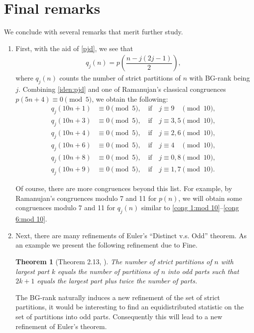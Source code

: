 \documentclass[12pt,reqno]{amsart}
\numberwithin{equation}{section}
\theoremstyle{plain}
\newtheorem{theorem}{Theorem}[section]
\theoremstyle{definition}
\begin{document}
\section{Final remarks}
We conclude with several remarks that merit further study.
\begin{enumerate}[1)]
\item First, with the aid of \eqref{pjd}, we see that
\begin{align}\label{iden:pjd}
q_{j}(n)=p\left(\dfrac{n-j(2j-1)}{2}\right),
\end{align}
where $q_{j}(n)$ counts the number of strict partitions of $n$ with BG-rank being $j$. Combining \eqref{iden:pjd} and one of Ramanujan's classical congruences \cite{Ram} $p(5n+4)\equiv0\pmod{5}$, we obtain the following:
\begin{align}
q_{j}(10n+1) &\equiv0\pmod{5},\quad \textrm{if}\quad j\equiv 9\phantom{,0} \pmod{10},\label{cong 1:mod 10}\\
q_{j}(10n+3)&\equiv0\pmod{5},\quad \textrm{if}\quad j\equiv 3,5\pmod{10},\label{cong 2:mod 10}\\
q_{j}(10n+4)&\equiv0\pmod{5},\quad \textrm{if}\quad j\equiv 2,6\pmod{10},\label{cong 3:mod 10}\\
q_{j}(10n+6)&\equiv0\pmod{5},\quad \textrm{if}\quad j\equiv 4\phantom{,0}\pmod{10},\label{cong 4:mod 10}\\
q_{j}(10n+8)&\equiv0\pmod{5},\quad \textrm{if}\quad j\equiv 0,8\pmod{10},\label{cong 5:mod 10}\\
q_{j}(10n+9)&\equiv0\pmod{5},\quad \textrm{if}\quad j\equiv 1,7\pmod{10}.\label{cong 6:mod 10}
\end{align}

Of course, there are more congruences beyond this list. For example, by Ramanujan's congruences modulo 7 and 11 for $p(n)$, we will obtain some congruences modulo 7 and 11 for $q_{j}(n)$ similar to \eqref{cong 1:mod 10}--\eqref{cong 6:mod 10}.

\item Next, there are many refinements of Euler's ``Distinct v.s. Odd'' theorem. As an example we present the following refinement due to Fine.
\begin{theorem}[Theorem 2.13, \cite{Andr1976}]
The number of strict partitions of $n$ with largest part $k$ equals the number of partitions of $n$ into odd parts such that $2k+1$ equals the largest part plus twice the number of parts.
\end{theorem}

The BG-rank naturally induces a new refinement of the set of strict partitions, it would be interesting to find an equidistributed statistic on the set of partitions into odd parts. Consequently this will lead to a new refinement of Euler's theorem.


\end{enumerate}
\end{document}
